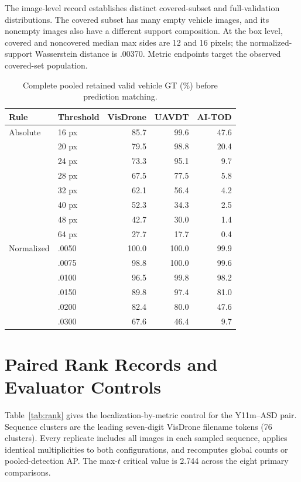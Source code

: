 \documentclass[journal]{IEEEtran}
\begin{document}
The image-level record establishes distinct covered-subset and full-validation distributions. The covered subset has many empty vehicle images, and its nonempty images also have a different support composition. At the box level, covered and noncovered median max sides are 12 and 16 pixels; the normalized-support Wasserstein distance is .00370. Metric endpoints target the observed covered-set population.

\begin{table}[!t]
\centering
\caption{Complete pooled retained valid vehicle GT (\%) before prediction matching.}\label{tab:retention}
\scriptsize
\setlength{\tabcolsep}{2.8pt}\renewcommand{\arraystretch}{.98}
\begin{tabular}{llrrr}
\toprule
Rule & Threshold & VisDrone & UAVDT & AI-TOD\\
\midrule
Absolute & 16 px & 85.7 & 99.6 & 47.6\\
 & 20 px & 79.5 & 98.8 & 20.4\\
 & 24 px & 73.3 & 95.1 & 9.7\\
 & 28 px & 67.5 & 77.5 & 5.8\\
 & 32 px & 62.1 & 56.4 & 4.2\\
 & 40 px & 52.3 & 34.3 & 2.5\\
 & 48 px & 42.7 & 30.0 & 1.4\\
 & 64 px & 27.7 & 17.7 & 0.4\\
\midrule
Normalized & .0050 & 100.0 & 100.0 & 99.9\\
 & .0075 & 98.8 & 100.0 & 99.6\\
 & .0100 & 96.5 & 99.8 & 98.2\\
 & .0150 & 89.8 & 97.4 & 81.0\\
 & .0200 & 82.4 & 80.0 & 47.6\\
 & .0300 & 67.6 & 46.4 & 9.7\\
\bottomrule
\end{tabular}
\end{table}

\section{Paired Rank Records and Evaluator Controls}
Table~\ref{tab:rank} gives the localization-by-metric control for the Y11m--ASD pair. Sequence clusters are the leading seven-digit VisDrone filename tokens (76 clusters). Every replicate includes all images in each sampled sequence, applies identical multiplicities to both configurations, and recomputes global counts or pooled-detection AP. The max-$t$ critical value is 2.744 across the eight primary comparisons.
\end{document}
